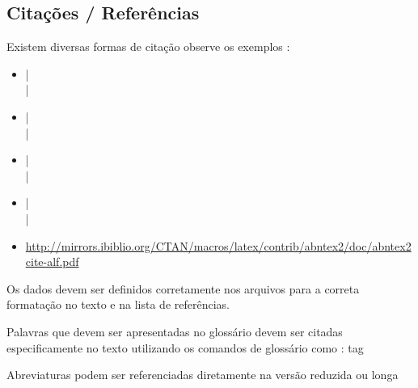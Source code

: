 \subsection{Citações / Referências}

Existem diversas formas de citação observe os exemplos :

\begin{itemize}
    \item \cite{UML:JACOBSON} | \cite{POWELL:2006} \\ 
        \cite{SCRUMGUIDE:2013} | \cite{urani1994}

    \item {} |  \\
         | 

    \item {}|  \\
         | 

    \item \citeauthor{UML:JACOBSON}| \citeauthor{POWELL:2006} \\
        \citeauthor{SCRUMGUIDE:2013}| \citeauthor{urani1994}
        
    \item \url{http://mirrors.ibiblio.org/CTAN/macros/latex/contrib/abntex2/doc/abntex2cite-alf.pdf}
\end{itemize}

Os dados devem ser definidos corretamente nos arquivos  para a correta formatação no texto e na lista de referências.

Palavras que devem ser apresentadas no glossário devem ser citadas especificamente no texto utilizando os comandos de glossário como : \gls{tag}


Abreviaturas podem ser referenciadas diretamente 
na versão reduzida  \space  
ou longa 
